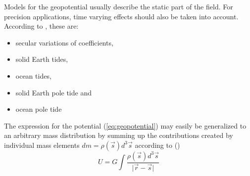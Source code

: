 \iffalse
Models for the geopotential usually describe the static part of the field. For 
precision applications, time varying effects should also be taken into account. 
According to \cite{iers2010}, these are:
\begin{itemize}
  \item secular variations of coefficients,
  \item solid Earth tides,
  \item ocean tides,
  \item solid Earth pole tide and
  \item ocean pole tide
\end{itemize}

The expression for the potential (\ref{eq:geopotential}) may easily be 
generalized to an arbitrary mass distribution by summing up the contributions 
created by individual mass elements
\(dm = \rho(\vec{s}) d^3 \vec{s}\) according to (\cite{Montenbruck2000})
\begin{equation}
    U = G \int{\frac{\rho(\vec{s}) d^3 \vec{s}}{\lvert \vec{r} - \vec{s} \rvert}}
\end{equation}

